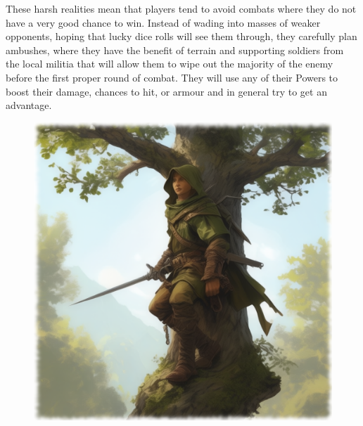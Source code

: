 These harsh realities mean that players tend to avoid combats where they do not have a very good chance to win. Instead of wading into masses of weaker opponents, hoping that lucky dice rolls will see them through, they carefully plan ambushes, where they have the benefit of terrain and supporting soldiers from the local militia that will allow them to wipe out the majority of the enemy before the first proper round of combat. They will use any of their Powers to boost their damage, chances to hit, or armour and in general try to get an advantage.


\begin{figure}%
\begin{center}
\includegraphics[scale=0.24]{img/ai-images/scout-on-tree.png}
\end{center}
\end{figure}

